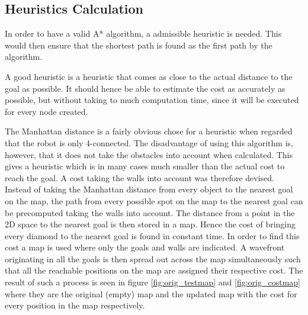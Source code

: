 \subsection{Heuristics Calculation}
In order to have a valid A* algorithm, a admissible heuristic is needed.
This would then ensure that the shortest path is found as the first path by the algorithm.

A good heuristic is a heuristic that comes as close to the actual distance to the goal as possible.
It should hence be able to estimate the cost as accurately as possible, but without taking to much computation time, since it will be executed for every node created.

The Manhattan distance is a fairly obvious chose for a heuristic when regarded that the robot is only 4-connected.
The disadvantage of using this algorithm is, however, that it does not take the obstacles into account when calculated.
This gives a heuristic which is in many cases much smaller than the actual cost to reach the goal.
A cost taking the walls into account was therefore devised.
Instead of taking the Manhattan distance from every object to the nearest goal on the map, the path from every possible spot on the map to the nearest goal can be precomputed taking the walls into account.
The distance from a point in the 2D space to the nearest goal is then stored in a map.
Hence the cost of bringing every diamond to the nearest goal is found in constant time.
In order to find this cost a map is used where only the goals and walls are indicated.
A wavefront originating in all the goals is then spread out across the map simultaneously such that all the reachable positions on the map are assigned their respective cost.
The result of such a process is seen in figure \ref{fig:orig_testmap} and \ref{fig:orig_costmap} where they are the original (empty) map and the updated map with the cost for every position in the map respectively.


